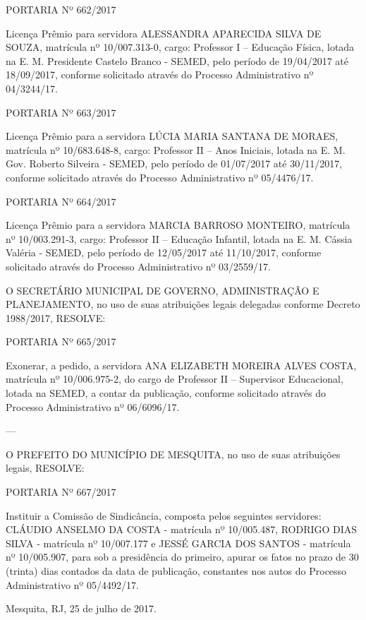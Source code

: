 \documentclass{doliberto}
\begin{document}
PORTARIA Nº 662/2017 
 
Licença  Prêmio  para 
servidora  ALESSANDRA 
APARECIDA SILVA DE SOUZA, matrícula nº 10/007.313-0, 
cargo:  Professor  I  –  Educação  Física,  lotada  na  E.  M. 
Presidente  Castelo  Branco  -  SEMED,  pelo  período  de 
19/04/2017  até  18/09/2017,  conforme  solicitado  através 
do Processo Administrativo nº 04/3244/17. 
 
PORTARIA Nº 663/2017 
 
Licença Prêmio para a servidora  LÚCIA MARIA SANTANA 
DE  MORAES,  matrícula  nº  10/683.648-8,  cargo:  Professor 
II  –  Anos  Iniciais,  lotada  na  E.  M.  Gov.  Roberto  Silveira  - 
SEMED,  pelo  período  de  01/07/2017  até  30/11/2017, 
conforme solicitado através do Processo Administrativo nº 
05/4476/17. 
 
PORTARIA Nº 664/2017 
 
Licença  Prêmio  para  a  servidora  MARCIA  BARROSO 
MONTEIRO, matrícula nº 10/003.291-3, cargo: Professor II 
– Educação Infantil, lotada na E. M. Cássia Valéria - SEMED, 
pelo  período  de  12/05/2017  até  11/10/2017,  conforme 
solicitado  através  do  Processo  Administrativo  nº 
03/2559/17. 
 
O  SECRETÁRIO  MUNICIPAL  DE  GOVERNO, 
ADMINISTRAÇÃO E PLANEJAMENTO, no uso de 
suas  atribuições 
legais  delegadas  conforme 
Decreto 1988/2017,  
RESOLVE: 
 
PORTARIA Nº 665/2017 
 
Exonerar,  a  pedido,  a  servidora  ANA  ELIZABETH 
MOREIRA  ALVES  COSTA,  matrícula  nº  10/006.975-2,  do 
cargo  de  Professor  II  –  Supervisor  Educacional,  lotada  na 
SEMED, a contar da publicação, conforme solicitado através 
do Processo Administrativo nº 06/6096/17. 

---

O PREFEITO DO MUNICÍPIO DE MESQUITA, no 
uso de suas atribuições legais, 
RESOLVE: 
 
PORTARIA Nº 667/2017 
 
Instituir  a  Comissão  de  Sindicância,  composta  pelos 
seguintes  servidores:  CLÁUDIO  ANSELMO  DA  COSTA  - 
matrícula  nº  10/005.487,  RODRIGO  DIAS  SILVA 
- 
matrícula  nº  10/007.177  e  JESSÉ  GARCIA  DOS  SANTOS  - 
matrícula  nº  10/005.907,  para  sob  a  presidência  do 
primeiro,  apurar  os  fatos  no  prazo  de  30  (trinta)  dias 
contados  da  data  de  publicação,  constantes  nos  autos  do 
Processo Administrativo nº 05/4492/17. 


Mesquita, RJ, 25 de julho de 2017. 
\end{document}
